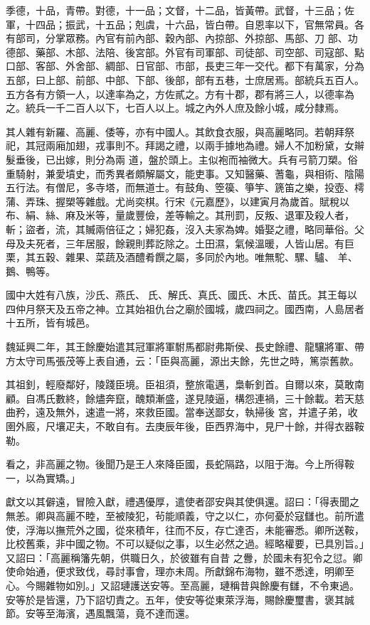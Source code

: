 \begin{pinyinscope}
 季德，十品，青帶。對德，十一品；文督，十二品，皆黃帶。武督，十三品；佐軍，十四品；振武，十五品；剋虞，十六品，皆白帶。自恩率以下，官無常員。各有部司，分掌眾務。內官有前內部、穀內部、內掠部、外掠部、馬部、刀
 部、功德部、藥部、木部、法陪、後宮部。外官有司軍部、司徒部、司空部、司寇部、點口部、客部、外舍部、綢部、日官部、市部，長吏三年一交代。都下有萬家，分為五部，曰上部、前部、中部、下部、後部，部有五巷，士庶居焉。部統兵五百人。五方各有方領一人，以達率為之，方佐貳之。方有十郡，郡有將三人，以德率為之。統兵一千二百人以下，七百人以上。城之內外人庶及餘小城，咸分隸焉。



 其人雜有新羅、高麗、倭等，亦有中國人。其飲食衣服，與高麗略同。若朝拜祭祀，其冠兩廂加翅，戎事則不。拜謁之禮，以兩手據地為禮。婦人不加粉黛，女辮髮垂後，已出嫁，則分為兩
 道，盤於頭上。主似袍而袖微大。兵有弓箭刀槊。俗重騎射，兼愛墳史，而秀異者頗解屬文，能吏事。又知醫藥、蓍龜，與相術、陰陽五行法。有僧尼，多寺塔，而無道士。有鼓角、箜篌、箏竽、篪笛之樂，投壺、樗蒲、弄珠、握槊等雜戲。尤尚奕棋。行宋《元嘉歷》，以建寅月為歲首。賦稅以布、絹、絲、麻及米等，量歲豐儉，差等輸之。其刑罰，反叛、退軍及殺人者，斬；盜者，流，其贓兩倍征之；婦犯姦，沒入夫家為婢。婚娶之禮，略同華俗。父母及夫死者，三年居服，餘親則葬訖除之。土田濕，氣候溫暖，人皆山居。有巨栗，其五穀、雜果、菜蔬及酒醴肴饌之屬，多同於內地。唯無駝、騾、驢、
 羊、鵝、鴨等。



 國中大姓有八族，沙氏、燕氏、氏、解氏、真氏、國氏、木氏、苗氏。其王每以四仲月祭天及五帝之神。立其始祖仇台之廟於國城，歲四祠之。國西南，人島居者十五所，皆有城邑。



 魏延興二年，其王餘慶始遣其冠軍將軍駙馬都尉弗斯侯、長史餘禮、龍驤將軍、帶方太守司馬張茂等上表自通，云：「臣與高麗，源出夫餘，先世之時，篤崇舊款。



 其祖釗，輕廢鄰好，陵踐臣境。臣祖須，整旅電邁，梟斬釗首。自爾以來，莫敢南顧。自馮氏數終，餘燼奔竄，醜類漸盛，遂見陵逼，構怨連禍，三十餘載。若天慈曲矜，遠及無外，速遣一將，來救臣國。當奉送鄙女，執掃後
 宮，并遣子弟，收圉外廄，尺壤疋夫，不敢自有。去庚辰年後，臣西界海中，見尸十餘，并得衣器鞍勒。



 看之，非高麗之物。後聞乃是王人來降臣國，長蛇隔路，以阻于海。今上所得鞍一，以為實矯。」



 獻文以其僻遠，冒險入獻，禮遇優厚，遣使者邵安與其使俱還。詔曰：「得表聞之無恙。卿與高麗不睦，至被陵犯，茍能順義，守之以仁，亦何憂於寇讎也。前所遣使，浮海以撫荒外之國，從來積年，往而不反，存亡達否，未能審悉。卿所送鞍，比校舊乘，非中國之物。不可以疑似之事，以生必然之過。經略權要，已具別旨。」又詔曰：「高麗稱籓先朝，供職日久，於彼雖有自昔
 之釁，於國未有犯令之愆。卿使命始通，便求致伐，尋討事會，理亦未周。所獻錦布海物，雖不悉達，明卿至心。今賜雜物如別。」又詔璉護送安等。至高麗，璉稱昔與餘慶有讎，不令東過。安等於是皆還，乃下詔切責之。五年，使安等從東萊浮海，賜餘慶璽書，褒其誠節。安等至海濱，遇風飄蕩，竟不達而還。




\end{pinyinscope}

